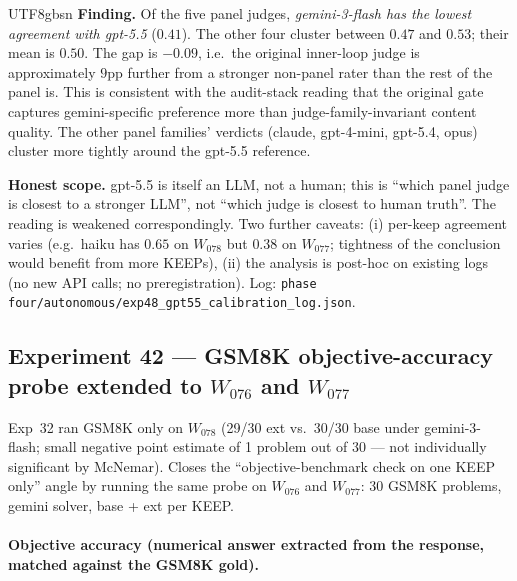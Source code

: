 \documentclass{article}
\begin{document}
\begin{CJK*}{UTF8}{gbsn}
\textbf{Finding.} Of the five panel judges, \emph{gemini-3-flash
has the lowest agreement with gpt-5.5} (\(0.41\)). The other four
cluster between \(0.47\) and \(0.53\); their mean is \(0.50\).
The gap is \(\mathbf{-0.09}\), i.e.\ the original inner-loop
judge is approximately \(9\)pp further from a stronger non-panel
rater than the rest of the panel is. This is consistent with the
audit-stack reading that the original gate captures
gemini-specific preference more than judge-family-invariant
content quality. The other panel families' verdicts (claude,
gpt-4-mini, gpt-5.4, opus) cluster more tightly around the
gpt-5.5 reference.

\textbf{Honest scope.} gpt-5.5 is itself an LLM, not a human;
this is ``which panel judge is closest to a stronger LLM'', not
``which judge is closest to human truth''. The reading is
weakened correspondingly. Two further caveats: (i) per-keep
agreement varies (e.g.\ haiku has \(0.65\) on \(W_{078}\) but
\(0.38\) on \(W_{077}\); tightness of the conclusion would
benefit from more KEEPs), (ii) the analysis is post-hoc on
existing logs (no new API calls; no preregistration). Log:
\texttt{phase four/autonomous/exp48\_gpt55\_calibration\_log.json}.

\subsection{Experiment 42 — GSM8K objective-accuracy probe
extended to \(W_{076}\) and \(W_{077}\)}
\label{sec:exp42}

Exp~32 ran GSM8K only on \(W_{078}\) (29/30 ext vs.\ 30/30 base
under gemini-3-flash; small negative point estimate of 1
problem out of 30 --- not individually significant by McNemar).
Closes the ``objective-benchmark check on one KEEP only''
angle by running the same probe on \(W_{076}\) and \(W_{077}\):
30 GSM8K problems, gemini solver, base + ext per KEEP.

\paragraph{Objective accuracy (numerical answer extracted from
the response, matched against the GSM8K gold).}


\end{CJK*}
\end{document}
